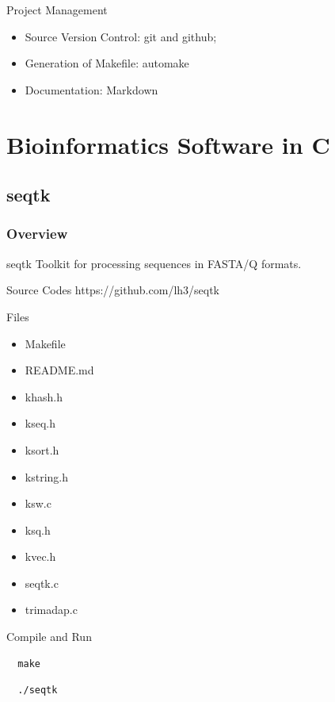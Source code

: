 \documentclass[UTF8]{beamer}
\begin{document}
\begin{frame}[t]{Project Management}
  \begin{itemize}
    \item Source Version Control: git and github;
    \item Generation of Makefile: automake
    \item Documentation: Markdown
  \end{itemize}
\end{frame}



\section{Bioinformatics Software in C}
\subsection{seqtk}
\begin{frame}
  \frametitle{Overview}
  \begin{block}{seqtk}
    Toolkit for processing sequences in FASTA/Q formats.
  \end{block}
  \begin{block}{Source Codes}
    https://github.com/lh3/seqtk
  \end{block}
\end{frame}

\begin{frame}[t]{Files}
\begin{itemize}
  \item Makefile
  \item README.md
  \item khash.h
  \item kseq.h
  \item ksort.h
  \item kstring.h
  \item ksw.c
  \item ksq.h
  \item kvec.h
  \item seqtk.c
  \item trimadap.c
\end{itemize}
\end{frame}

\begin{frame}[t, fragile]{Compile and Run}
\begin{verbatim}
  make
\end{verbatim}

\begin{verbatim}
  ./seqtk
\end{verbatim}
\end{frame}
\end{document}
